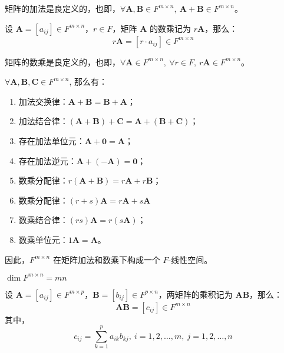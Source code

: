 \begin{proposition}
    矩阵的加法是良定义的，也即，$\forall \mathbf{A},\mathbf{B}\in F^{m \times n},\ \mathbf{A}+\mathbf{B}\in F^{m \times n}$。
\end{proposition}

\begin{definition}
    设 $\mathbf{A} = [a_{ij}] \in F^{m \times n}$，$r\in F$，矩阵 $\mathbf{A}$ 的数乘记为 $r\mathbf{A}$，那么：
    \[
       r\mathbf{A} = [r \cdot a_{ij}] \in F^{m \times n}
    \]
\end{definition}

\begin{proposition}
    矩阵的数乘是良定义的，也即，$\forall \mathbf{A}\in F^{m \times n},\ \forall r\in F,\ r\mathbf{A}\in F^{m \times n}$。
\end{proposition}

\begin{proposition}[矩阵线性空间]
    $\forall \mathbf{A}, \mathbf{B},\mathbf{C} \in F^{m\times n}$, 那么有：
    \begin{enumerate}
        \item 加法交换律：$\mathbf{A} + \mathbf{B} = \mathbf{B} + \mathbf{A}$；
        \item 加法结合律：$(\mathbf{A} + \mathbf{B}) + \mathbf{C} = \mathbf{A} + (\mathbf{B} + \mathbf{C})$；
        \item 存在加法单位元：$\mathbf{A} + \mathbf{0} = \mathbf{A}$；
        \item 存在加法逆元：$\mathbf{A} + (-\mathbf{A}) = \mathbf{0}$；
        \item 数乘分配律：$r(\mathbf{A} + \mathbf{B}) = r\mathbf{A} + r\mathbf{B}$；
        \item 数乘分配律：$(r+s)\mathbf{A} = r\mathbf{A} + s\mathbf{A}$
        \item 数乘结合律：$(rs)\mathbf{A} = r(s\mathbf{A})$；
        \item 数乘单位元：$1\mathbf{A} = \mathbf{A}$。
    \end{enumerate}
    因此，$F^{m \times n}$ 在矩阵加法和数乘下构成一个 $F$-线性空间。
\end{proposition}

\begin{proposition}[矩阵线性空间的维度]
    $\dim F^{m \times n} = mn$
\end{proposition}


\begin{definition}
    设 $\mathbf{A} = [a_{ij}] \in F^{m \times p}$，$\mathbf{B} = [b_{ij}] \in F^{p \times n}$，两矩阵的乘积记为 $\mathbf{A}\mathbf{B}$，那么：
    \[
       \mathbf{A}\mathbf{B} = [c_{ij}] \in F^{m \times n}
    \]
    其中，
    \[
        c_{ij} = \sum_{k=1}^{p} a_{ik} b_{kj},\ i=1,2,\ldots,m,\ j=1,2,\ldots,n
    \]
    \label{def:matrix_multiplication}
\end{definition}

